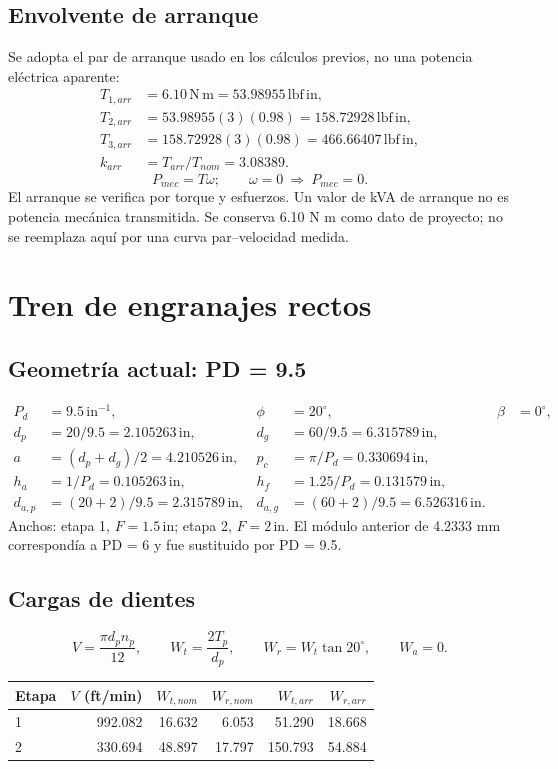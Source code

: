\documentclass[11pt,a4paper]{article}
\newcommand{\inch}{\,\mathrm{in}}
\newcommand{\lbin}{\,\mathrm{lbf\,in}}
\begin{document}
\subsection{Envolvente de arranque}
Se adopta el par de arranque usado en los cálculos previos, no una potencia eléctrica aparente:
\begin{align*}
T_{1,arr}&=6.10\,\mathrm{N\,m}=53.98955\lbin,\\
T_{2,arr}&=53.98955(3)(0.98)=158.72928\lbin,\\
T_{3,arr}&=158.72928(3)(0.98)=466.66407\lbin,\\
k_{arr}&=T_{arr}/T_{nom}=3.08389.
\end{align*}
\[
P_{mec}=T\omega;\qquad\omega=0\ \Longrightarrow\ P_{mec}=0.
\]
El arranque se verifica por torque y esfuerzos. Un valor de kVA de arranque no es potencia mecánica transmitida. Se conserva 6.10 N m como dato de proyecto; no se reemplaza aquí por una curva par--velocidad medida.

\section{Tren de engranajes rectos}
\subsection{Geometría actual: PD = 9.5}
\begin{align*}
P_d&=9.5\,\mathrm{in}^{-1}, & \phi&=20^\circ,&\beta&=0^\circ,\\
d_p&=20/9.5=2.105263\inch,&d_g&=60/9.5=6.315789\inch,\\
a&=(d_p+d_g)/2=4.210526\inch,&p_c&=\pi/P_d=0.330694\inch,\\
h_a&=1/P_d=0.105263\inch,&h_f&=1.25/P_d=0.131579\inch,\\
d_{a,p}&=(20+2)/9.5=2.315789\inch,&d_{a,g}&=(60+2)/9.5=6.526316\inch.
\end{align*}
Anchos: etapa 1, $F=1.5\inch$; etapa 2, $F=2\inch$. El módulo anterior de 4.2333 mm correspondía a PD = 6 y fue sustituido por PD = 9.5.

\subsection{Cargas de dientes}
\[
V=\frac{\pi d_p n_p}{12},\qquad W_t=\frac{2T_p}{d_p},\qquad
W_r=W_t\tan20^\circ,\qquad W_a=0.
\]

\begin{center}\small\begin{tabular}{lrrrrr}\toprule

Etapa & $V$ (ft/min) & $W_{t,nom}$ & $W_{r,nom}$ & $W_{t,arr}$ & $W_{r,arr}$ \\ \midrule

1 & 992.082 & 16.632 & 6.053 & 51.290 & 18.668 \\

2 & 330.694 & 48.897 & 17.797 & 150.793 & 54.884 \\

\bottomrule\end{tabular}\end{center}
\end{document}
